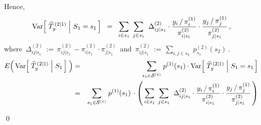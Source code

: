 \begin{enumerate}
	Hence,
	\begin{equation*}
	\textnormal{Var}\!\left[\, \left.\widehat{T}^{\,(2 \vert 1)}_{y} \;\right\vert\, S_{1} = s_{1} \,\right]
	\;\; = \;\;
		\underset{i \in s_{1}}{\sum}\;\,
		\underset{j \in s_{1}}{\sum}\;\;
			\Delta^{(2)}_{ij \vert s_{1}}
			\cdot
			\dfrac{ y_{i} \,/\, \pi^{(1)}_{i} }{ \pi^{(2)}_{i \vert s_{1}} }
			\cdot
			\dfrac{ y_{j} \,/\, \pi^{(1)}_{j} }{ \pi^{(2)}_{j \vert s_{1}} }\,,
	\end{equation*}
	where
	\,$\Delta^{(2)}_{ij \vert s_{1}} \, := \, \pi^{(2)}_{ij \vert s_{1}} - \pi^{(2)}_{i \vert s_{1}} \cdot \pi^{(2)}_{j \vert s_{1}}$\,
	and
	\,$\pi^{(2)}_{ij \vert s_{1}} \, := \, \underset{i,j \in s_{2}}{\sum}\; p^{(2)}_{s_{1}}(s_{2})$\,.
	\begin{eqnarray*}
	E\!\left(\, \textnormal{Var}\!\left[\, \left.\widehat{T}^{\,(2 \vert 1)}_{y} \;\right\vert\, S_{1} \,\right] \;\right)
	& = &
		\underset{s_{1} \in \mathcal{S}^{(1)}}{\sum}\;
		p^{(1)}(s_{1}) \cdot \textnormal{Var}\!\left[\, \left.\widehat{T}^{\,(2 \vert 1)}_{y} \;\right\vert\, S_{1} = s_{1} \,\right]
	\\
	& = &
		\underset{s_{1} \in \mathcal{S}^{(1)}}{\sum}\;
		p^{(1)}(s_{1}) \,\cdot
		\left(\,
		\underset{i \in s_{1}}{\sum}\;\,
		\underset{j \in s_{1}}{\sum}\;\;
			\Delta^{(2)}_{ij \vert s_{1}}
			\cdot
			\dfrac{ y_{i} \,/\, \pi^{(1)}_{i} }{ \pi^{(2)}_{i \vert s_{1}} }
			\cdot
			\dfrac{ y_{j} \,/\, \pi^{(1)}_{j} }{ \pi^{(2)}_{j \vert s_{1}} }
		\,\right)
	\end{eqnarray*}
\end{enumerate}
\qed


\renewcommand{\theenumi}{\roman{enumi}}
\renewcommand{\labelenumi}{\textnormal{(\theenumi)}$\;\;$}
